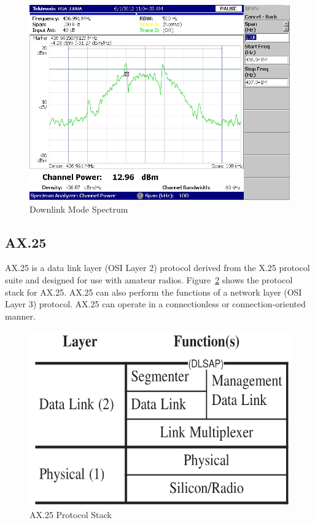 \documentclass[letter,12pt]{article}
\begin{document}
		\begin{figure}[h!]
			\centering
			\includegraphics[width=\textwidth]{./PNGs/Downlink_100k_span_19200.png}
			\caption{Downlink Mode Spectrum}
			\label{fig:Downlink}			
		\end{figure}			
		
	\subsection{AX.25}
		AX.25 is a data link layer (OSI Layer 2) protocol derived from the X.25 protocol suite and designed for use with amateur radios. Figure~\ref{fig:AX25_Protocol_Stack} shows the protocol stack for AX.25. AX.25 can also perform the functions of a network layer (OSI Layer 3) protocol. AX.25 can operate in a connectionless or connection-oriented manner. \cite{Beech_98}
	
		\begin{figure}[h!]
			\centering
			\includegraphics[width=.5\textwidth]{./PNGs/AX25_Protocol_Stack.png}
			\caption{AX.25 Protocol Stack \cite{Beech_98}}
			\label{fig:AX25_Protocol_Stack}			
		\end{figure}
		
\end{document}
